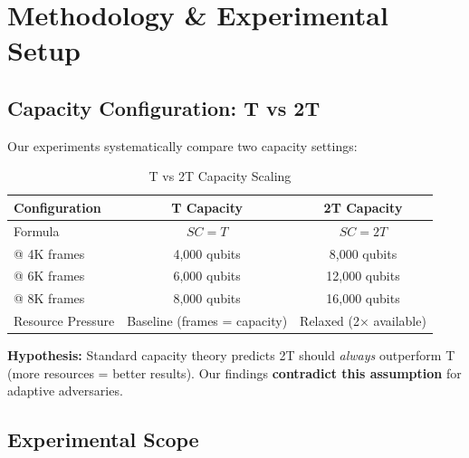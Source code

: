 \documentclass[11pt,a4paper]{article}
\newcommand{\critical}[1]{\textcolor{criticalcolor}{\textbf{#1}}}
\begin{document}
\section{Methodology \& Experimental Setup}

\subsection{Capacity Configuration: T vs 2T}

Our experiments systematically compare two capacity settings:

\vspace{-0.4cm}
\begin{table}[h]
\scriptsize
\centering
\begin{tabular}{lcc}
\toprule
\textbf{Configuration} & \textbf{T Capacity} & \textbf{2T Capacity} \\
\midrule
Formula & $SC = T$ & $SC = 2T$ \\
@ 4K frames & 4,000 qubits & 8,000 qubits \\
@ 6K frames & 6,000 qubits & 12,000 qubits \\
@ 8K frames & 8,000 qubits & 16,000 qubits \\
Resource Pressure & Baseline (frames = capacity) & Relaxed (2× available) \\
\bottomrule
\end{tabular}
\vspace{-0.2cm}
\caption{T vs 2T Capacity Scaling}
\end{table}

\vspace{-0.2cm}
\textbf{Hypothesis:} Standard capacity theory predicts 2T should \textit{always} outperform T (more resources = better results). Our findings \critical{contradict this assumption} for adaptive adversaries.

\subsection{Experimental Scope}
\end{document}
